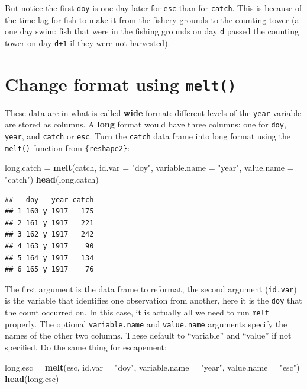 \documentclass[]{book}
\newenvironment{Shaded}{\begin{snugshade}}{\end{snugshade}}
\newcommand{\KeywordTok}[1]{\textcolor[rgb]{0.13,0.29,0.53}{\textbf{#1}}}
\newcommand{\DataTypeTok}[1]{\textcolor[rgb]{0.13,0.29,0.53}{#1}}
\newcommand{\StringTok}[1]{\textcolor[rgb]{0.31,0.60,0.02}{#1}}
\newcommand{\NormalTok}[1]{#1}
\theoremstyle{definition}
\theoremstyle{definition}
\theoremstyle{definition}
\theoremstyle{remark}
\begin{document}
But notice the first \texttt{doy} is one day later for \texttt{esc} than
for \texttt{catch}. This is because of the time lag for fish to make it
from the fishery grounds to the counting tower (a one day swim: fish
that were in the fishing grounds on day \texttt{d} passed the counting
tower on day \texttt{d+1} if they were not harvested).

\section{\texorpdfstring{Change format using
\texttt{melt()}}{Change format using melt()}}\label{change-format-using-melt}

These data are in what is called \textbf{wide} format: different levels
of the \texttt{year} variable are stored as columns. A \textbf{long}
format would have three columns: one for \texttt{doy}, \texttt{year},
and \texttt{catch} or \texttt{esc}. Turn the \texttt{catch} data frame
into long format using the \texttt{melt()} function from
\texttt{\{reshape2\}}:

\begin{Shaded}
\begin{Highlighting}[]
\NormalTok{long.catch =}\StringTok{ }\KeywordTok{melt}\NormalTok{(catch, }\DataTypeTok{id.var =} \StringTok{"doy"}\NormalTok{,}
                  \DataTypeTok{variable.name =} \StringTok{"year"}\NormalTok{,}
                  \DataTypeTok{value.name =} \StringTok{"catch"}\NormalTok{)}
\KeywordTok{head}\NormalTok{(long.catch)}
\end{Highlighting}
\end{Shaded}

\begin{verbatim}
##   doy   year catch
## 1 160 y_1917   175
## 2 161 y_1917   221
## 3 162 y_1917   242
## 4 163 y_1917    90
## 5 164 y_1917   134
## 6 165 y_1917    76
\end{verbatim}

The first argument is the data frame to reformat, the second argument
(\texttt{id.var}) is the variable that identifies one observation from
another, here it is the \texttt{doy} that the count occurred on. In this
case, it is actually all we need to run \texttt{melt} properly. The
optional \texttt{variable.name} and \texttt{value.name} arguments
specify the names of the other two columns. These default to
``variable'' and ``value'' if not specified. Do the same thing for
escapement:

\begin{Shaded}
\begin{Highlighting}[]
\NormalTok{long.esc =}\StringTok{ }\KeywordTok{melt}\NormalTok{(esc, }\DataTypeTok{id.var =} \StringTok{"doy"}\NormalTok{,}
                \DataTypeTok{variable.name =} \StringTok{"year"}\NormalTok{,}
                \DataTypeTok{value.name =} \StringTok{"esc"}\NormalTok{)}
\KeywordTok{head}\NormalTok{(long.esc)}
\end{Highlighting}
\end{Shaded}
\end{document}
